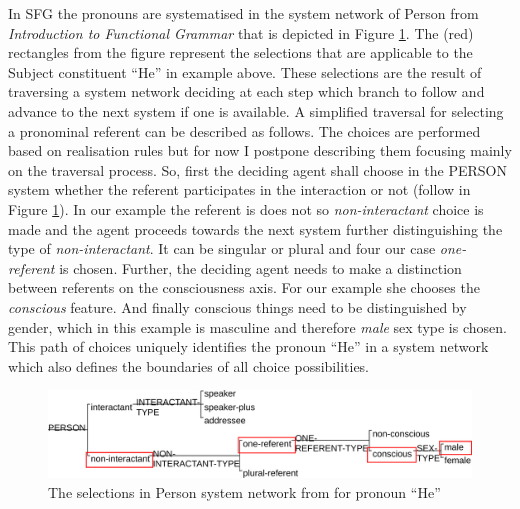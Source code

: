 In SFG the pronouns are systematised in the system network of Person from \textit{Introduction to Functional Grammar} \citep[366]{Halliday2013} that is depicted in Figure \ref{fig:person-system-network}. The (red) rectangles from the figure represent the selections that are applicable to the Subject constituent ``He'' in example above. These selections are the result of traversing a system network deciding at each step which branch to follow and advance to the next system if one is available. A simplified traversal for selecting a pronominal referent can be described as follows. The choices are performed based on realisation rules but for now I postpone describing them focusing mainly on the traversal process. So, first the deciding agent shall choose in the PERSON system whether the referent participates in the interaction or not (follow in Figure \ref{fig:person-system-network}). In our example the referent is does not so \textit{non-interactant} choice is made and the agent proceeds towards the next system further distinguishing the type of \textit{non-interactant}. It can be singular or plural and four our case \textit{one-referent} is chosen. Further, the deciding agent needs to make a distinction between referents on the consciousness axis. For our example she chooses the \textit{conscious} feature. And finally conscious things need to be distinguished by gender, which in this example is masculine and therefore \textit{male} sex type is chosen. This path of choices uniquely identifies the pronoun ``He'' in a system network which also defines the boundaries of all choice possibilities. 
 
\begin{figure}[!ht]
    \centering      
    \includegraphics[width=.90\textwidth]{Figures/Example/person-selections.pdf}      
    \caption{The selections in Person system network from \citet[366]{Halliday2013} for pronoun ``He''}
    \label{fig:person-system-network}
\end{figure}


